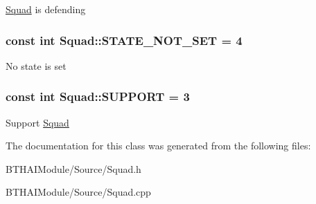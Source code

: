 \hyperlink{class_squad}{Squad} is defending \hypertarget{class_squad_a045ef512b08228c6a03b92258f957e45}{
\subsubsection[{S\-T\-A\-T\-E\-\_\-\-N\-O\-T\-\_\-\-S\-E\-T}]{\setlength{\rightskip}{0pt plus 5cm}const int Squad\-::\-S\-T\-A\-T\-E\-\_\-\-N\-O\-T\-\_\-\-S\-E\-T = 4\hspace{0.3cm}{\ttfamily [static]}}}\label{class_squad_a045ef512b08228c6a03b92258f957e45}
No state is set \hypertarget{class_squad_a76a852c62242a800efe90ea38aa1fb5e}{
\subsubsection[{S\-U\-P\-P\-O\-R\-T}]{\setlength{\rightskip}{0pt plus 5cm}const int Squad\-::\-S\-U\-P\-P\-O\-R\-T = 3\hspace{0.3cm}{\ttfamily [static]}}}\label{class_squad_a76a852c62242a800efe90ea38aa1fb5e}
Support \hyperlink{class_squad}{Squad} 

The documentation for this class was generated from the following files\-:\begin{DoxyCompactItemize}
\item 
B\-T\-H\-A\-I\-Module/\-Source/Squad.\-h\item 
B\-T\-H\-A\-I\-Module/\-Source/Squad.\-cpp\end{DoxyCompactItemize}

